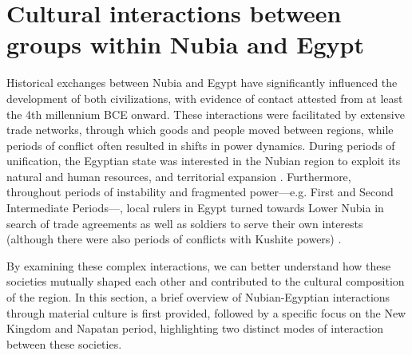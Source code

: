 \section{Cultural interactions between groups within Nubia and Egypt}


Historical exchanges between Nubia and Egypt have significantly influenced the development of both civilizations, with evidence of contact attested from at least the 4th millennium BCE onward. These interactions were facilitated by extensive trade networks, through which goods and people moved between regions, while periods of conflict often resulted in shifts in power dynamics. During periods of unification, the Egyptian state was interested in the Nubian region to exploit its natural and human resources, and territorial expansion \parencites[p.~94-95]{seidlmayerNubierImÄgytischen2002}[p.~570]{raueNubiansEgypt3rd2019}. Furthermore, throughout periods of instability and fragmented power---e.g. First and Second Intermediate Periods---, local rulers in Egypt turned towards Lower Nubia in search of trade agreements as well as soldiers to serve their own interests (although there were also periods of conflicts with Kushite powers) \parencites{daviesKushEgyptNew2003}[p.~141]{näserStructuresRealitiesEgyptianNubian2013}{polzTerritorialClaimPolitical2018}{morenogarcíaShapingNewIdentities2024}.


By examining these complex interactions, we can better understand how these societies mutually shaped each other and contributed to the cultural composition of the region. In this section, a brief overview of Nubian-Egyptian interactions through material culture is first provided, followed by a specific focus on the New Kingdom and Napatan period, highlighting two distinct modes of interaction between these societies.


